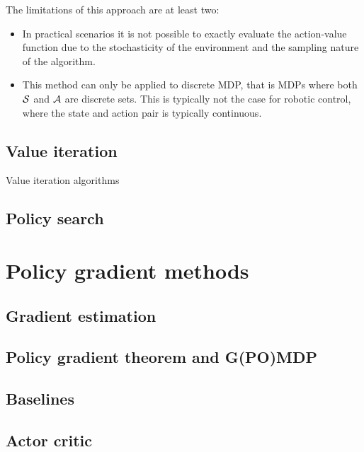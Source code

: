 The limitations of this approach are at least two:
\begin{itemize}
\item In practical scenarios it is not possible to exactly evaluate the action-value function due to the stochasticity of the environment and the sampling nature of the algorithm.
\item This method can only be applied to discrete MDP, that is MDPs where both $\mathcal{S}$ and $\mathcal{A}$ are discrete sets. This is typically not the case for robotic control, where the state and action pair is typically continuous.
\end{itemize}

\subsection{Value iteration}
Value iteration algorithms 

\subsection{Policy search}

\section{Policy gradient methods}
\subsection{Gradient estimation}
\subsection{Policy gradient theorem and G(PO)MDP}
\subsection{Baselines}
\subsection{Actor critic}



 